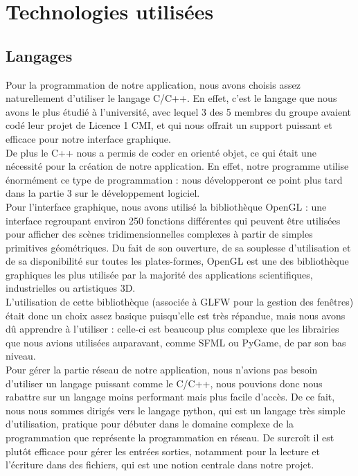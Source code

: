 \documentclass{report}
\begin{document}

\chapter{Technologies utilisées}
\section{Langages}
Pour la programmation de notre application, nous avons choisis assez naturellement d'utiliser le langage C/C++. En effet, c'est le langage que nous avons le plus étudié à l'université, avec lequel 3 des 5 membres du groupe avaient codé leur projet de Licence 1 CMI, et qui nous offrait un support puissant et efficace pour notre interface graphique. \\
De plus le C++ nous a permis de coder en orienté objet, ce qui était une nécessité pour la création de notre application. En effet, notre programme utilise énormément ce type de programmation : nous développeront ce point plus tard dans la partie 3 sur le développement logiciel. \\

Pour l'interface graphique, nous avons utilisé la bibliothèque OpenGL : une interface regroupant environ 250 fonctions différentes qui peuvent être utilisées pour afficher des scènes tridimensionnelles complexes à partir de simples primitives géométriques. Du fait de son ouverture, de sa souplesse d'utilisation et de sa disponibilité sur toutes les plates-formes, OpenGL est une des bibliothèque graphiques les plus utilisée par la majorité des applications scientifiques, industrielles ou artistiques 3D. \\
L'utilisation de cette bibliothèque (associée à GLFW pour la gestion des fenêtres) était donc un choix assez basique puisqu'elle est très répandue, mais nous avons dû apprendre à l'utiliser : celle-ci est beaucoup plus complexe que les librairies que nous avions utilisées auparavant, comme SFML ou PyGame, de par son bas niveau. \\

Pour gérer la partie réseau de notre application, nous n'avions pas besoin d'utiliser un langage puissant comme le C/C++, nous pouvions donc nous rabattre sur un langage moins performant mais plus facile d'accès.
De ce fait, nous nous sommes dirigés vers le langage python, qui est un langage très simple d'utilisation, pratique pour débuter dans le domaine complexe de la programmation que représente la programmation en réseau. De surcroît il est plutôt efficace pour gérer les entrées sorties, notamment pour la lecture et l'écriture dans des fichiers, qui est une notion centrale dans notre projet.\\
\end{document}
